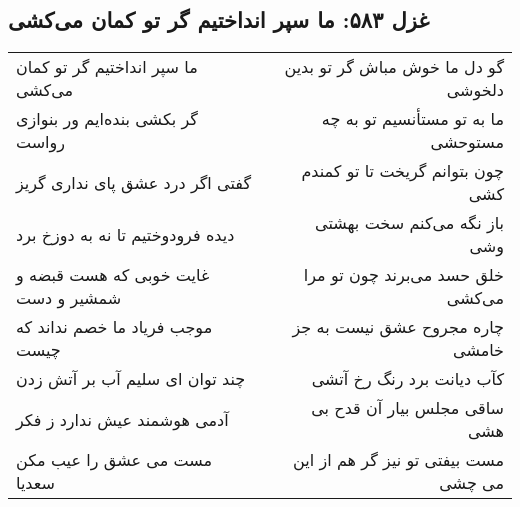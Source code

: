 \begin{center}
\section*{غزل ۵۸۳: ما سپر انداختیم گر تو کمان می‌کشی}
\label{sec:583}
\begin{longtable}{l p{0.5cm} r}
ما سپر انداختیم گر تو کمان می‌کشی
&&
گو دل ما خوش مباش گر تو بدین دلخوشی
\\
گر بکشی بنده‌ایم ور بنوازی رواست
&&
ما به تو مستأنسیم تو به چه مستوحشی
\\
گفتی اگر درد عشق پای نداری گریز
&&
چون بتوانم گریخت تا تو کمندم کشی
\\
دیده فرودوختیم تا نه به دوزخ برد
&&
باز نگه می‌کنم سخت بهشتی وشی
\\
غایت خوبی که هست قبضه و شمشیر و دست
&&
خلق حسد می‌برند چون تو مرا می‌کشی
\\
موجب فریاد ما خصم نداند که چیست
&&
چاره مجروح عشق نیست به جز خامشی
\\
چند توان ای سلیم آب بر آتش زدن
&&
کآب دیانت برد رنگ رخ آتشی
\\
آدمی هوشمند عیش ندارد ز فکر
&&
ساقی مجلس بیار آن قدح بی هشی
\\
مست می عشق را عیب مکن سعدیا
&&
مست بیفتی تو نیز گر هم از این می چشی
\\
\end{longtable}
\end{center}
